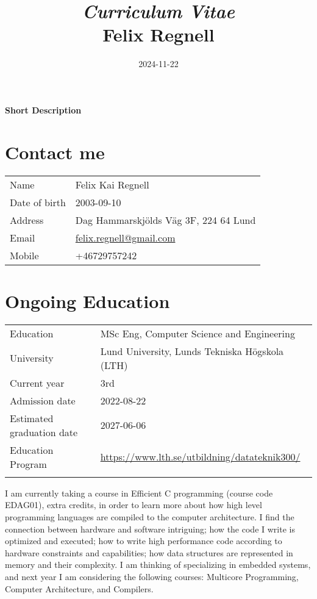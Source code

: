 \documentclass{cv}
\title{\vspace{-0.5em}\textit{Curriculum Vitae}\\\textbf{Felix Regnell}}
\date{\vspace{-3.0em} 2024-11-22}
\begin{document}
\maketitle


\vspace{-2.1em}\begin{center}
	\textbf{Short Description}
\end{center}

\vspace{1.1em}\section{Contact me}

\begin{tabular*}{\textwidth}{p{5cm} l}
	Name           & Felix Kai Regnell \\
	Date of birth  & 2003-09-10 \\
	Address        & Dag Hammarskjölds Väg 3F, 224 64 Lund \\
	Email          & \url{felix.regnell@gmail.com} \\
	Mobile         & +46729757242
\end{tabular*}

\section{Ongoing Education}

\begin{tabular*}{\textwidth}{p{5cm} l}
	Education                  & MSc Eng, Computer Science and Engineering 	 \\
	University                 & Lund University, Lunds Tekniska Högskola (LTH) \\
	Current year               & 3rd	     \\
	Admission date             & 2022-08-22 \\
	Estimated graduation date  & 2027-06-06 \\
	Education Program& \url{https://www.lth.se/utbildning/datateknik300/}\\ \\
\end{tabular*}

I am currently taking a course in Efficient C programming (course code EDAG01), extra credits, in order to learn more about how high level programming languages are compiled to the computer architecture. I find the connection between hardware and software intriguing; how the code I write is optimized and executed; how to write high performance code according to hardware constraints and capabilities; how data structures are represented in memory and their complexity. I am thinking of specializing in embedded systems, and next year I am considering the following courses: Multicore Programming, Computer Architecture, and Compilers.
\end{document}
